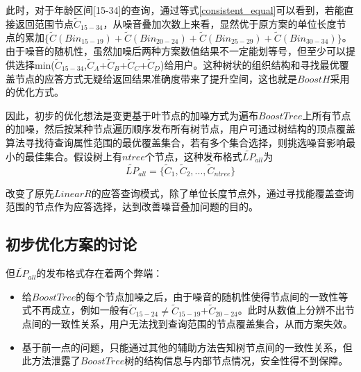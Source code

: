 此时，对于年龄区间[15-34]的查询，通过等式\ref{consistent_equal}可以看到，若能直接返回范围节点{$\widetilde{C}_{15-34}$}，从噪音叠加次数上来看，显然优于原方案的单位长度节点的累加$\{\tilde{C}(Bin_{15-19})+\tilde{C}(Bin_{20-24})+\tilde{C}(Bin_{25-29})+\tilde{C}(Bin_{30-34})\}$。由于噪音的随机性，虽然加噪后两种方案数值结果不一定能划等号，但至少可以提供选择min({$\tilde{C}_{15-34}$},{$\tilde{C}_{A}$}+{$\tilde{C}_{B}$}+{$\tilde{C}_{C}$}+{$\tilde{C}_{D}$})给用户。这种树状的组织结构和寻找最优覆盖节点的应答方式无疑给返回结果准确度带来了提升空间，这也就是$BoostH$采用的优化方式。

因此，初步的优化想法是变更基于叶节点的加噪方式为遍布$BoostTree$上所有节点的加噪，然后按某种节点遍历顺序发布所有树节点，用户可通过树结构的顶点覆盖算法寻找待查询属性范围的最优覆盖集合，若有多个集合选择，则挑选噪音影响最小的最佳集合。假设树上有$ntree$个节点，这种发布格式$\tilde{LP}_{all}$为
\begin{equation}
\label{L_allnodes}
\widetilde{LP}_{all} = \{\tilde{C}_{1},\tilde{C}_{2},...,\tilde{C}_{ntree}\}
\end{equation}

改变了原先$LinearR$的应答查询模式，除了单位长度节点外，通过寻找能覆盖查询范围的节点作为应答选择，达到改善噪音叠加问题的目的。

\subsection{初步优化方案的讨论}
\label{BoostH}

但$\widetilde{LP}_{all}$的发布格式存在着两个弊端：
\begin{itemize}
	\item 给$BoostTree$的每个节点加噪之后，由于噪音的随机性使得节点间的一致性等式不再成立，例如一般有{$\tilde{C}_{15-24}$}$ \neq ${$\tilde{C}_{15-19}$}+{$\tilde{C}_{20-24}$}。此时从数值上分辨不出节点间的一致性关系，用户无法找到查询范围的节点覆盖集合，从而方案失效。
	\item 基于前一点的问题，只能通过其他的辅助方法告知树节点间的一致性关系，但此方法泄露了$BoostTree$树的结构信息与内部节点情况，安全性得不到保障。
\end{itemize}

